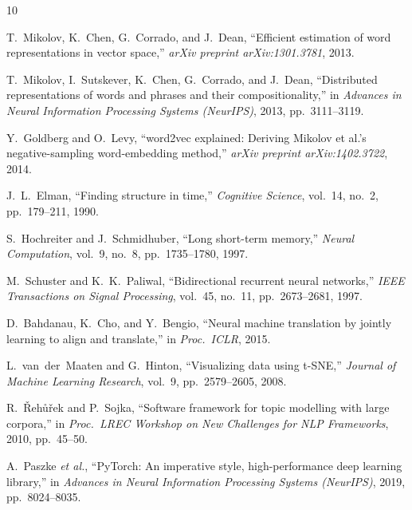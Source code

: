 \documentclass[11pt,a4paper]{article}
\begin{document}
\begin{thebibliography}{10}

T.~Mikolov, K.~Chen, G.~Corrado, and J.~Dean,
``Efficient estimation of word representations in vector space,''
\textit{arXiv preprint arXiv:1301.3781}, 2013.

T.~Mikolov, I.~Sutskever, K.~Chen, G.~Corrado, and J.~Dean,
``Distributed representations of words and phrases and their compositionality,''
in \textit{Advances in Neural Information Processing Systems (NeurIPS)}, 2013, pp.~3111--3119.

Y.~Goldberg and O.~Levy,
``word2vec explained: Deriving Mikolov et al.'s negative-sampling word-embedding method,''
\textit{arXiv preprint arXiv:1402.3722}, 2014.

J.~L.~Elman,
``Finding structure in time,''
\textit{Cognitive Science}, vol.~14, no.~2, pp.~179--211, 1990.

S.~Hochreiter and J.~Schmidhuber,
``Long short-term memory,''
\textit{Neural Computation}, vol.~9, no.~8, pp.~1735--1780, 1997.

M.~Schuster and K.~K.~Paliwal,
``Bidirectional recurrent neural networks,''
\textit{IEEE Transactions on Signal Processing}, vol.~45, no.~11, pp.~2673--2681, 1997.

D.~Bahdanau, K.~Cho, and Y.~Bengio,
``Neural machine translation by jointly learning to align and translate,''
in \textit{Proc.\ ICLR}, 2015.

L.~van~der~Maaten and G.~Hinton,
``Visualizing data using t-SNE,''
\textit{Journal of Machine Learning Research}, vol.~9, pp.~2579--2605, 2008.

R.~\v{R}eh\r{u}\v{r}ek and P.~Sojka,
``Software framework for topic modelling with large corpora,''
in \textit{Proc.\ LREC Workshop on New Challenges for NLP Frameworks}, 2010, pp.~45--50.

A.~Paszke \textit{et al.},
``PyTorch: An imperative style, high-performance deep learning library,''
in \textit{Advances in Neural Information Processing Systems (NeurIPS)}, 2019, pp.~8024--8035.

\end{thebibliography}
\end{document}
